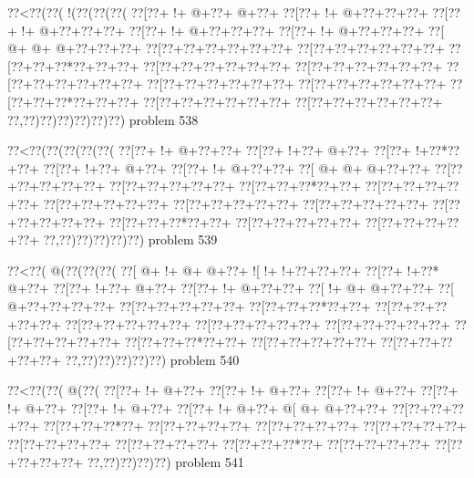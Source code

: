 \vbox{\vbox{\goo
\0??<\0??(\0??(\- !(\0??(\0??(\0??(
\0??[\0??+\- !+\- @+\0??+\- @+\0??+
\0??[\0??+\- !+\- @+\0??+\0??+\0??+
\0??[\0??+\- !+\- @+\0??+\0??+\0??+
\0??[\0??+\- !+\- @+\0??+\0??+\0??+
\0??[\0??+\- !+\- @+\0??+\0??+\0??+
\0??[\- @+\- @+\- @+\0??+\0??+\0??+
\0??[\0??+\0??+\0??+\0??+\0??+\0??+
\0??[\0??+\0??+\0??+\0??+\0??+\0??+
\0??[\0??+\0??+\0??*\0??+\0??+\0??+
\0??[\0??+\0??+\0??+\0??+\0??+\0??+
\0??[\0??+\0??+\0??+\0??+\0??+\0??+
\0??[\0??+\0??+\0??+\0??+\0??+\0??+
\0??[\0??+\0??+\0??+\0??+\0??+\0??+
\0??[\0??+\0??+\0??+\0??+\0??+\0??+
\0??[\0??+\0??+\0??*\0??+\0??+\0??+
\0??[\0??+\0??+\0??+\0??+\0??+\0??+
\0??[\0??+\0??+\0??+\0??+\0??+\0??+
\0??,\0??)\0??)\0??)\0??)\0??)\0??)
}
\hfil problem 538\hfil\break
}

\vbox{\vbox{\goo
\0??<\0??(\0??(\0??(\0??(\0??(
\0??[\0??+\- !+\- @+\0??+\0??+
\0??[\0??+\- !+\0??+\- @+\0??+
\0??[\0??+\- !+\0??*\0??+\0??+
\0??[\0??+\- !+\0??+\- @+\0??+
\0??[\0??+\- !+\- @+\0??+\0??+
\0??[\- @+\- @+\- @+\0??+\0??+
\0??[\0??+\0??+\0??+\0??+\0??+
\0??[\0??+\0??+\0??+\0??+\0??+
\0??[\0??+\0??+\0??*\0??+\0??+
\0??[\0??+\0??+\0??+\0??+\0??+
\0??[\0??+\0??+\0??+\0??+\0??+
\0??[\0??+\0??+\0??+\0??+\0??+
\0??[\0??+\0??+\0??+\0??+\0??+
\0??[\0??+\0??+\0??+\0??+\0??+
\0??[\0??+\0??+\0??*\0??+\0??+
\0??[\0??+\0??+\0??+\0??+\0??+
\0??[\0??+\0??+\0??+\0??+\0??+
\0??,\0??)\0??)\0??)\0??)\0??)
}
\hfil problem 539\hfil\break
}

\vbox{\vbox{\goo
\0??<\0??(\- @(\0??(\0??(\0??(
\0??[\- @+\- !+\- @+\- @+\0??+
\- ![\- !+\- !+\0??+\0??+\0??+
\0??[\0??+\- !+\0??*\- @+\0??+
\0??[\0??+\- !+\0??+\- @+\0??+
\0??[\0??+\- !+\- @+\0??+\0??+
\0??[\- !+\- @+\- @+\0??+\0??+
\0??[\- @+\0??+\0??+\0??+\0??+
\0??[\0??+\0??+\0??+\0??+\0??+
\0??[\0??+\0??+\0??*\0??+\0??+
\0??[\0??+\0??+\0??+\0??+\0??+
\0??[\0??+\0??+\0??+\0??+\0??+
\0??[\0??+\0??+\0??+\0??+\0??+
\0??[\0??+\0??+\0??+\0??+\0??+
\0??[\0??+\0??+\0??+\0??+\0??+
\0??[\0??+\0??+\0??*\0??+\0??+
\0??[\0??+\0??+\0??+\0??+\0??+
\0??[\0??+\0??+\0??+\0??+\0??+
\0??,\0??)\0??)\0??)\0??)\0??)
}
\hfil problem 540\hfil\break
}

\vbox{\vbox{\goo
\0??<\0??(\0??(\- @(\0??(
\0??[\0??+\- !+\- @+\0??+
\0??[\0??+\- !+\- @+\0??+
\0??[\0??+\- !+\- @+\0??+
\0??[\0??+\- !+\- @+\0??+
\0??[\0??+\- !+\- @+\0??+
\0??[\0??+\- !+\- @+\0??+
\- @[\- @+\- @+\0??+\0??+
\0??[\0??+\0??+\0??+\0??+
\0??[\0??+\0??+\0??*\0??+
\0??[\0??+\0??+\0??+\0??+
\0??[\0??+\0??+\0??+\0??+
\0??[\0??+\0??+\0??+\0??+
\0??[\0??+\0??+\0??+\0??+
\0??[\0??+\0??+\0??+\0??+
\0??[\0??+\0??+\0??*\0??+
\0??[\0??+\0??+\0??+\0??+
\0??[\0??+\0??+\0??+\0??+
\0??,\0??)\0??)\0??)\0??)
}
\hfil problem 541\hfil\break
}

